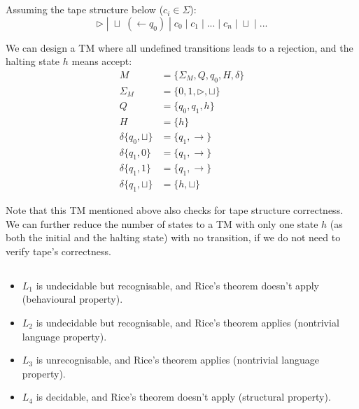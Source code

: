 \documentclass[12pt]{article}
\begin{document}
\section{}

\subsection{}

Assuming the tape structure below ($c_i \in \Sigma$):
$$
\triangleright \;|\; \sqcup\;(\leftarrow q_0) \;|\; c_0 \;|\; c_1 \;|\; ... \;|\; c_n \;|\; \sqcup \;|\; ...
$$

We can design a TM where all undefined transitions leads to a rejection, and the halting state $h$ means accept:
$$ 
\begin{aligned}
M &= \{\Sigma_M, Q, q_0, H, \delta\} \\
\Sigma_M & = \{0, 1, \triangleright, \sqcup\} \\
Q & = \{q_0, q_1, h\} \\
H & = \{h\} \\
\delta\{q_0, \sqcup\} & = \{q_1, \rightarrow\} \\
\delta\{q_1, 0\} & = \{q_1, \rightarrow\} \\
\delta\{q_1, 1\} & = \{q_1, \rightarrow\} \\
\delta\{q_1, \sqcup\} &= \{h, \sqcup\}
\end{aligned}
$$

Note that this TM mentioned above also checks for tape structure correctness. We can further reduce the number of states to a TM with only one state $h$ (as both the initial and the halting state) with no transition, if we do not need to verify tape's correctness.

\subsection{}
\begin{itemize}
    \item $L_1$ is undecidable but recognisable, and Rice's theorem doesn't apply (behavioural property).
    \item $L_2$ is undecidable but recognisable, and Rice's theorem applies (nontrivial language property).
    \item $L_3$ is unrecognisable, and Rice's theorem applies (nontrivial language property).
    \item $L_4$ is decidable, and Rice's theorem doesn't apply (structural property).
\end{itemize}
\end{document}
